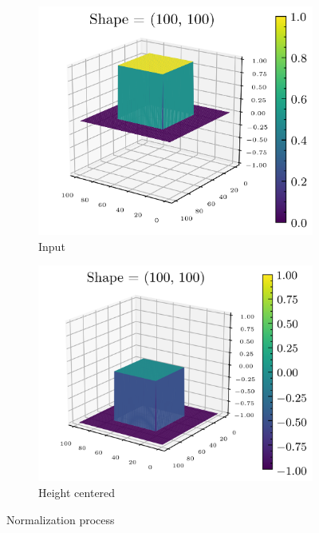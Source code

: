 \documentclass[../document.tex]{subfiles}
\begin{document}
\begin{figure}[H]
          \begin{subfigure}[b]{0.5\textwidth}
        \includegraphics[width=\textwidth]{../img/data-aug/3d/square-middle.png}
        \caption{Input}
    \end{subfigure}
    \begin{subfigure}[b]{0.5\textwidth}
        \includegraphics[width=\textwidth]{../img/data-aug/3d/square-middle-center.png}
        \caption{Height centered}
    \end{subfigure}  
\label{fig: center}
\caption{Normalization process}    
\end{figure}
\end{document}
